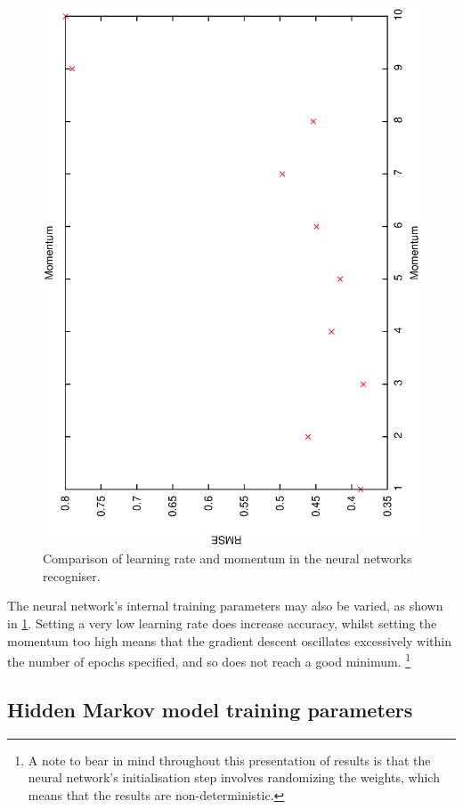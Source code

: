\documentclass[12pt,a4,notitlepage]{report}
\renewcommand{\_}{\texttt{\symbol{95}}}
\newcommand{\<}{\texttt{\symbol{60}}}
\renewcommand{\>}{\texttt{\symbol{62}}}
\begin{document}
\begin{figure}
\includegraphics[scale=0.3,angle=-90]{results/neural_err/n_momentum.ps}
\caption{Comparison of learning rate and momentum in the neural networks recogniser.}
\label{n_floatparameters}
\end{figure}

The neural network's internal training parameters may also be varied, as shown in \ref{n_floatparameters}. Setting a very low learning rate does increase accuracy, whilst setting the momentum too high means that the gradient descent oscillates excessively within the number of epochs specified, and so does not reach a good minimum. \footnote{A note to bear in mind throughout this presentation of results is that the neural network's initialisation step involves randomizing the weights, which means that the results are non-deterministic.}

\subsection{Hidden Markov model training parameters}
\end{document}
